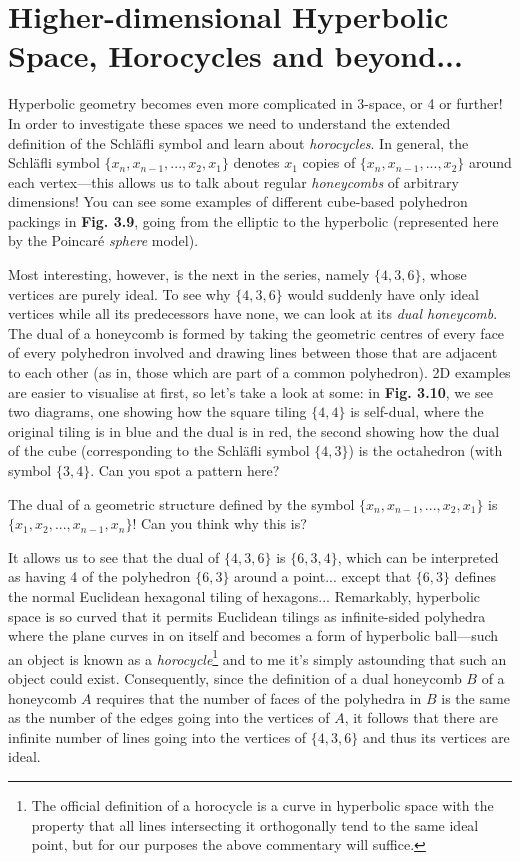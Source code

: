 \section{Higher-dimensional Hyperbolic Space, Horocycles and beyond...}

\begin{multicols}{2}

Hyperbolic geometry becomes even more complicated in 3-space, or 4 or further! In order to investigate these spaces we need to understand the extended definition of the Schl\"{a}fli symbol and learn about \textit{horocycles}. In general, the Schl\"{a}fli symbol \(\{x_n, x_{n-1},...,x_2,x_1\}\) denotes \(x_1\) copies of \(\{x_n, x_{n-1},...,x_2\}\) around each vertex---this allows us to talk about regular \textit{honeycombs} of arbitrary dimensions! You can see some examples of different cube-based polyhedron packings in \textbf{Fig. 3.9}, going from the elliptic to the hyperbolic (represented here by the Poincar\'{e} \textit{sphere} model).

Most interesting, however, is the next in the series, namely \(\{4,3,6\}\), whose vertices are purely ideal. To see why \(\{4,3,6\}\) would suddenly have only ideal vertices while all its predecessors have none, we can look at its \textit{dual honeycomb}. The dual of a honeycomb is formed by taking the geometric centres of every face of every polyhedron involved and drawing lines between those that are adjacent to each other (as in, those which are part of a common polyhedron). 2D examples are easier to visualise at first, so let's take a look at some: in \textbf{Fig. 3.10}, we see two diagrams, one showing how the square tiling \(\{4,4\}\) is self-dual, where the original tiling is in blue and the dual is in red, the second showing how the dual of the cube (corresponding to the Schl\"{a}fli symbol \(\{4,3\}\)) is the octahedron (with symbol \(\{3,4\}\). Can you spot a pattern here?

The dual of a geometric structure defined by the symbol \(\{x_n, x_{n-1},...,x_2,x_1\}\) is \(\{x_1, x_2,...,x_{n-1},x_n\}\)! Can you think why this is? 

It allows us to see that the dual of \(\{4,3,6\}\) is \(\{6,3,4\}\), which can be interpreted as having 4 of the polyhedron \(\{6,3\}\) around a point... except that \(\{6,3\}\) defines the normal Euclidean hexagonal tiling of hexagons... Remarkably, hyperbolic space is so curved that it permits Euclidean tilings as infinite-sided polyhedra where the plane curves in on itself and becomes a form of hyperbolic ball---such an object is known as a \textit{horocycle}\footnote{The official definition of a horocycle is a curve in hyperbolic space with the property that all lines intersecting it orthogonally tend to the same ideal point, but for our purposes the above commentary will suffice.} and to me it's simply astounding that such an object could exist. Consequently, since the definition of a dual honeycomb \(B\) of a honeycomb \(A\) requires that the number of faces of the polyhedra in \(B\) is the same as the number of the edges going into the vertices of \(A\), it follows that there are infinite number of lines going into the vertices of \(\{4,3,6\}\) and thus its vertices are ideal.


\end{multicols}
